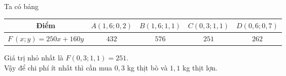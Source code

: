 \begin{ex}
{\begin{itemchoice}
			Ta có bảng  
			\begin{center}
				\begin{tabular}{|c|c|c|c|c|}
					\hline
					Điểm & $A(1{,}6;0{,}2)$ & $B(1{,}6;1{,}1)$ & $C(0{,}3;1{,}1)$ & $D(0{,}6;0{,}7)$ \\
					\hline
					$F\ (x;y)=250x+160y$ & $432$ & $576$ & $251$ & $262$ \\
					\hline
				\end{tabular}
			\end{center}
			Giá trị nhỏ nhất là $F(0{,}3;1{,}1)=251$.\\
			Vậy để chi phí ít nhất thì cần mua $0{,}3$ kg thịt bò và $1{,}1$ kg thịt lợn. 
		\end{itemchoice} 
	} 
\end{ex}


